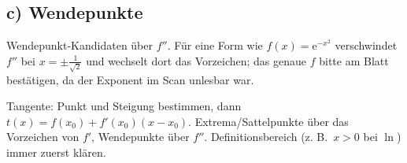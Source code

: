 \subsection*{c) Wendepunkte}
\begin{kontrolle}
Wendepunkt-Kandidaten über $f''$. Für eine Form wie $f(x)=\mathrm e^{-x^2}$
verschwindet $f''$ bei $x=\pm\frac{1}{\sqrt2}$ und wechselt dort das Vorzeichen;
das genaue $f$ bitte am Blatt bestätigen, da der Exponent im Scan unlesbar war.
\end{kontrolle}

\begin{merksatz}
Tangente: Punkt und Steigung bestimmen, dann $t(x)=f(x_0)+f'(x_0)(x-x_0)$.
Extrema/Sattelpunkte über das Vorzeichen von $f'$, Wendepunkte über $f''$.
Definitionsbereich (z. B.\ $x>0$ bei $\ln$) immer zuerst klären.
\end{merksatz}
